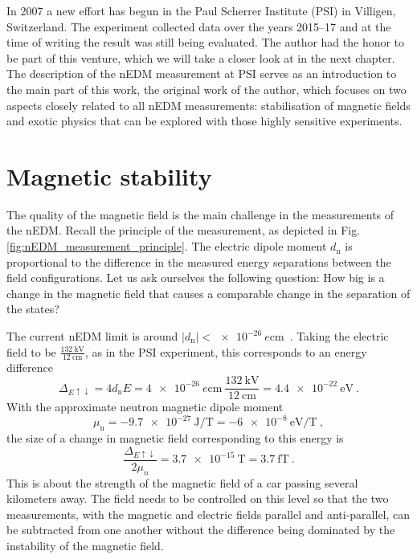 In 2007 a new effort has begun in the Paul Scherrer Institute (PSI) in Villigen, Switzerland. The experiment collected data over the years 2015--17 and at the time of writing the result was still being evaluated. The author had the honor to be part of this venture, which we will take a closer look at in the next chapter. The description of the nEDM measurement at PSI serves as an introduction to the main part of this work, the original work of the author, which focuses on two aspects closely related to all nEDM measurements: stabilisation of magnetic fields and exotic physics that can be explored with those highly sensitive experiments.



\section{Magnetic stability}
The quality of the magnetic field is the main challenge in the measurements of the nEDM\@. Recall the principle of the measurement, as depicted in Fig.\,\ref{fig:nEDM_measurement_principle}. The electric dipole moment $d_\text{n}$ is proportional to the difference in the measured energy separations between the field configurations. Let us ask ourselves the following question: How big is a change in the magnetic field that causes a comparable change in the separation of the states?

The current nEDM limit is around $|d_\text{n}| < \SI{e-26}{\elementarycharge\centi\meter}$~\cite{PhysRevLett.97.131801}. Taking the electric field to be $\frac{ \SI{132}{\kilo\volt} }{ \SI{12}{\centi\meter} }$, as in the PSI experiment, this corresponds to an energy difference
\begin{equation}
  \Delta_{E\uparrow\downarrow} = 4 d_\text{n} E = \SI{4e-26}{\elementarycharge\centi\meter} \ \frac{ \SI{132}{\kilo\volt} }{ \SI{12}{\centi\meter} } = \SI{4.4e-22}{\electronvolt} \ .
\end{equation}
With the approximate neutron magnetic dipole moment~\cite{PDG2016}
\begin{equation}
  \mu_\text{n} = \SI{-9.7e-27}{\joule\per\tesla} = \SI{-6e-8}{\electronvolt\per\tesla} \ ,
\end{equation}
the size of a change in magnetic field corresponding to this energy is
\begin{equation}
  \frac{ \Delta_{E\uparrow\downarrow} }{2 \mu_n} = \SI{3.7e-15}{\tesla} = \SI{3.7}{\femto\tesla} \ .
\end{equation}
This is about the strength of the magnetic field of a car passing several kilometers away. The field needs to be controlled on this level so that the two measurements, with the magnetic and electric fields parallel and anti-parallel, can be subtracted from one another without the difference being dominated by the instability of the magnetic field.

